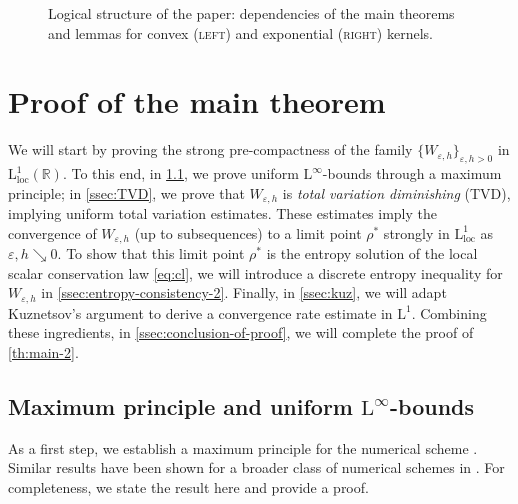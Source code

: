 \documentclass[10pt]{amsart}
\theoremstyle{plain}
\theoremstyle{definition}
\numberwithin{equation}{section}
\newcommand{\R}{\mathbb{R}}
\newcommand{\eps}{{\varepsilon}}
\begin{document}
\begin{figure}[htbp]
{
}
    \caption{Logical structure of the paper: dependencies of the main theorems and lemmas for convex (\textsc{left}) and exponential (\textsc{right}) kernels.}
    \label{fig:logic_diagram}
\end{figure}


\section{Proof of the main theorem}
\label{sec:proof-2}

We will start by proving the strong pre-compactness of the family $\{W_{\eps,h}\}_{\eps,h>0}$ in $\mathrm{L}^1_{\mathrm{loc}}(\R)$. To this end, in \cref{ssec:l-infty}, we prove uniform $\mathrm{L}^\infty$-bounds through a maximum principle; in \cref{ssec:TVD}, we prove that $W_{\eps,h}$ is \emph{total variation diminishing} (TVD), implying uniform total variation estimates. These estimates imply the convergence of $W_{\eps,h}$ (up to subsequences) to a limit point $\rho^\ast$ strongly in $\mathrm{L}^1_{\mathrm{loc}}$ as $\eps,h\searrow0$. To show that this limit point $\rho^\ast$ is the entropy solution of the local scalar conservation law \cref{eq:cl}, we will introduce a discrete entropy inequality for $W_{\eps,h}$ in \cref{ssec:entropy-consistency-2}. Finally, in \cref{ssec:kuz}, we will adapt Kuznetsov's argument \cite{MR483509} to derive a convergence rate estimate in $\mathrm{L}^1$. Combining these ingredients, in \cref{ssec:conclusion-of-proof}, we will complete the proof of \cref{th:main-2}.

\subsection{Maximum principle and uniform \texorpdfstring{$\mathrm{L}^\infty$}{L-infinity}-bounds} 
\label{ssec:l-infty}
As a first step, we establish a maximum principle for the numerical scheme . Similar results have been shown for a broader class of numerical schemes in \cite{MR3447130,JF2023,MR4742183}. For completeness, we state the result here and provide a proof.
\end{document}
